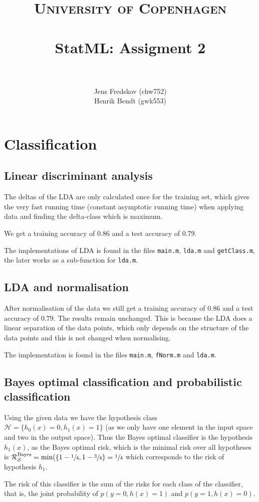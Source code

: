 \documentclass[a4paper, 11pt]{article}
\title{ 
\normalfont \normalsize 
\textsc{University of Copenhagen} \\ [25pt]
\horrule{0.5pt} \\[0.4cm]
\huge StatML: Assigment 2\\
\horrule{2pt} \\[0.5cm]
}
\author{Jens Fredskov (chw752)\\Henrik Bendt (gwk553)}
\begin{document}
\maketitle

\pagebreak
\section{Classification}
\subsection{Linear discriminant analysis}
The deltas of the LDA are only calculated once for the training set, which gives the very fast running time (constant asymptotic running time) when applying data and finding the delta-class which is maximum.

We get a training accuracy of $0.86$ and a test accuracy of $0.79$.

The implementations of LDA is found in the files \texttt{main.m}, \texttt{lda.m} and \texttt{getClass.m}, the later works as a sub-function for \texttt{lda.m}.

\subsection{LDA and normalisation}
After normalisation of the data we still get a training accuracy of $0.86$ and a test accuracy of $0.79$. The results remain unchanged. This is because the LDA does a linear separation of the data points, which only depends on the structure of the data points and this is not changed when normalising.

The implementation is found in the files \texttt{main.m}, \texttt{fNorm.m} and \texttt{lda.m}.

\subsection{Bayes optimal classification and probabilistic classification}
Using the given data we have the hypothesis class $\mathcal{H} = \{ h_0(x) = 0, h_1(x) = 1 \}$ (as we only have one element in the input space and two in the output space). Thus the Bayes optimal classifier is the hypothesis $h_1(x)$, as the Bayes optimal risk, which is the minimal risk over all hypotheses is $\mathcal{R}^{\text{Bayes}}_{\mathcal{S}} = \min(\{ 1 - \sfrac{1}{4}, 1 - \sfrac{3}{4}\} = \sfrac{1}{4}$ which corresponds to the risk of hypothesis $h_1$.

The risk of this classifier is the sum of the risks for each class of the classifier, that is, the joint probability of $p(y=0,h(x)=1)$ and $p(y=1,h(x)=0)$.
\end{document}

